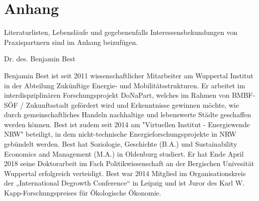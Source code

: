 \documentclass[a4paper,11pt,twoside]{scrartcl}
\begin{document}
\clearpage


%


\clearpage
\appendix

\section{Anhang}

Literaturlisten, Lebensläufe und gegebenenfalls Interessensbekundungen von Praxispartnern sind im Anhang beizufügen.

Dr. des. Benjamin Best 

Benjamin Best ist seit 2011 wissenschaftlicher Mitarbeiter am Wuppertal Institut in der Abteilung Zukünftige Energie- und Mobilitätsstrukturen. Er arbeitet im interdispziplinären Forschungsprojekt DoNaPart, welches im Rahmen von BMBF-SÖF / Zukunftsstadt gefördert wird und Erkenntnisse gewinnen möchte, wie durch gemeinschaftliches Handeln nachhaltige und lebenswerte Städte geschaffen werden können. Best ist zudem seit 2014 am "Virtuellen Institut - Energiewende NRW" beteiligt, in dem nicht-technische Energieforschungsprojekte in NRW gebündelt werden. 
Best hat Soziologie, Geschichte (B.A.) und Sustainability Economics and Management (M.A.) in Oldenburg studiert. Er hat Ende April 2018 seine Doktorarbeit im Fach Politikwissenschaft an der Bergischen Univesität Wuppertal erfolgreich verteidigt. Best war 2014 Mitglied im Organisationskreis der „International Degrowth Conference“ in Leipzig und ist Juror des Karl W. Kapp-Forschungspreises für Ökologische Ökonomie. 
\end{document}

